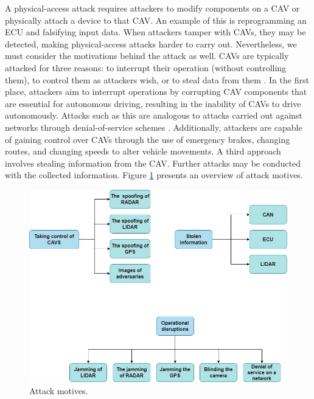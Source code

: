 \documentclass[a4paper,12pt]{article}
\begin{document}
\hspace{5mm} A physical-access attack requires attackers to modify components on a CAV or physically attach a device to that CAV. An example of this is reprogramming an ECU and falsifying input data. When attackers tamper with CAVs, they may be detected, making physical-access attacks harder to carry out. Nevertheless, we must consider the motivations behind the attack as well. CAVs are typically attacked for three reasons: to interrupt their operation (without controlling them), to control them as attackers wish, or to steal data from them \cite{article22}. In the first place, attackers aim to interrupt operations by corrupting CAV components that are essential for autonomous driving, resulting in the inability of CAVs to drive autonomously. Attacks such as this are analogous to attacks carried out against networks through denial-of-service schemes \cite{article22}. Additionally, attackers are capable of gaining control over CAVs through the use of emergency brakes, changing routes, and changing speeds to alter vehicle movements. A third approach involves stealing information from the CAV. Further attacks may be conducted with the collected information. Figure \ref{fig:Attack motives} presents an overview of attack motives.

\begin{figure}[H]
  \centering
  \includegraphics*[width=1.0 \columnwidth]{img/Motivations for attacks}
  \caption{Attack motives.}   
  \label{fig:Attack motives}
\end{figure}
\end{document}
